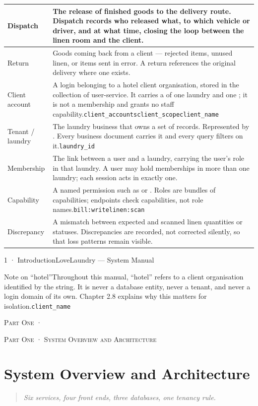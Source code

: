 \documentclass[11pt,a4paper,oneside]{book}
\begin{document}
\begin{center}
\begin{tabularx}{\linewidth}{|X|X|}
Dispatch & The release of finished goods to the delivery route. Dispatch records who released what, to which vehicle or driver, and at what time, closing the loop between the linen room and the client. \\ \hline
Return & Goods coming back from a client — rejected items, unused linen, or items sent in error. A return references the original delivery where one exists. \\ \hline
Client account & A login belonging to a hotel client organisation, stored in the  collection of user-service. It carries a  of one laundry and one ; it is not a membership and grants no staff capability.\texttt{client\_accounts}\texttt{client\_scope}\texttt{client\_name} \\ \hline
Tenant / laundry & The laundry business that owns a set of records. Represented by . Every business document carries it and every query filters on it.\texttt{laundry\_id} \\ \hline
Membership & The link between a user and a laundry, carrying the user's role in that laundry. A user may hold memberships in more than one laundry; each session acts in exactly one. \\ \hline
Capability & A named permission such as  or . Roles are bundles of capabilities; endpoints check capabilities, not role names.\texttt{bill:write}\texttt{linen:scan} \\ \hline
Discrepancy & A mismatch between expected and scanned linen quantities or statuses. Discrepancies are recorded, not corrected silently, so that loss patterns remain visible. \\ \hline
\end{tabularx}
\end{center}
1 · IntroductionLoveLaundry — System Manual

\begin{notebox}Note on “hotel”Throughout this manual, “hotel” refers to a client organisation identified by the  string. It is never a database entity, never a tenant, and never a login domain of its own. Chapter 2.8 explains why this matters for isolation.\texttt{client\_name}\end{notebox}
\textsc{\small\color{crimson}Part One ·}\par\medskip
\textsc{\small\color{crimson}Part One · System Overview and Architecture}\par\medskip
\chapter{System Overview and Architecture}
\begin{quote}\itshape Six services, four front ends, three databases, one tenancy rule.\end{quote}
\end{document}
